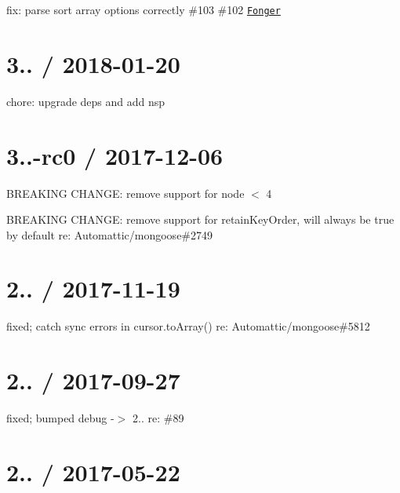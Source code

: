 \begin{DoxyItemize}
\item fix\+: parse sort array options correctly \#103 \#102 \href{https://github.com/Fonger}{\tt Fonger}
\end{DoxyItemize}

\section*{3.. / 2018-\/01-\/20 }


\begin{DoxyItemize}
\item chore\+: upgrade deps and add nsp
\end{DoxyItemize}

\section*{3..-\/rc0 / 2017-\/12-\/06 }


\begin{DoxyItemize}
\item B\+R\+E\+A\+K\+I\+NG C\+H\+A\+N\+GE\+: remove support for node $<$ 4
\item B\+R\+E\+A\+K\+I\+NG C\+H\+A\+N\+GE\+: remove support for retain\+Key\+Order, will always be true by default re\+: Automattic/mongoose\#2749
\end{DoxyItemize}

\section*{2.. / 2017-\/11-\/19 }


\begin{DoxyItemize}
\item fixed; catch sync errors in cursor.\+to\+Array() re\+: Automattic/mongoose\#5812
\end{DoxyItemize}

\section*{2.. / 2017-\/09-\/27 }


\begin{DoxyItemize}
\item fixed; bumped debug -\/$>$ 2.. re\+: \#89
\end{DoxyItemize}

\section*{2.. / 2017-\/05-\/22 }



